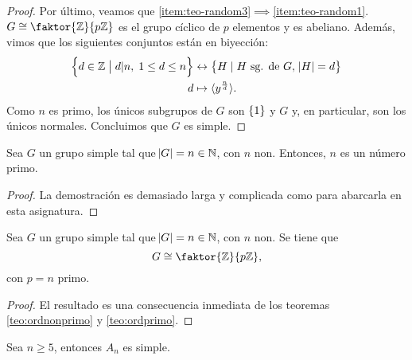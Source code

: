 \begin{proof}
    \noindent Por último, veamos que \ref{item:teo-random3}$\implies$\ref{item:teo-random1}. $G \cong \faktor{\z}{p\z}$ es el grupo cíclico de $p$ elementos y es abeliano.
    Además, vimos que los siguientes conjuntos están en biyección:
    \[
        \begin{aligned}
            \left\{d \in \mathbb{Z} \bigm\vert d \vert n, \; 1 \leq d \leq n \right\} &\leftrightarrow
            \left\{H \mid H \text{ sg. de } G, \; \abs{H} = d\right\} \\
            d &\mapsto \langle y^{\frac{n}{d}} \rangle.
        \end{aligned}
    \]
    Como $n$ es primo, los únicos subgrupos de $G$ son $\left\{1\right\}$ y $G$ y, en particular, son los únicos normales. Concluimos que
    $G$ es simple.
\end{proof}

\begin{teo}\label{teo:ordnonprimo}
    Sea $G$ un grupo simple tal que $\abs{G} = n\in\mathbb{N}$, con $n$ non. Entonces, $n$ es un número primo.
\end{teo}
\begin{proof}
    La demostración es demasiado larga y complicada como para abarcarla en esta asignatura.
\end{proof}
\begin{col}
    Sea $G$ un grupo simple tal que $\abs{G} = n\in\mathbb{N}$, con $n$ non. Se tiene que
    \[
        G \cong \faktor{\z}{p\z},
    \]
    con $p=n$ primo.
\end{col}
\begin{proof}
    El resultado es una consecuencia inmediata de los teoremas \ref{teo:ordnonprimo} y \ref{teo:ordprimo}.
\end{proof}

\begin{teo*}
    Sea $n \geq 5$, entonces $A_n$ es simple.
\end{teo*}

